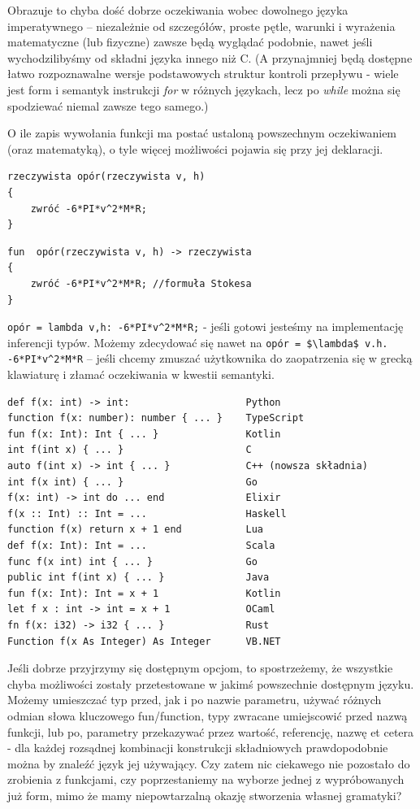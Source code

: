 Obrazuje to chyba dość dobrze oczekiwania wobec dowolnego języka imperatywnego – niezależnie od szczegółów, proste pętle, warunki i wyrażenia matematyczne (lub fizyczne) zawsze będą wyglądać podobnie, nawet jeśli wychodzilibyśmy od składni języka innego niż C. (A przynajmniej będą dostępne łatwo rozpoznawalne wersje podstawowych struktur kontroli przepływu - wiele jest form i semantyk instrukcji \textit{for} w różnych językach, lecz po \textit{while} można się spodziewać niemal zawsze tego samego.)

O ile zapis wywołania funkcji ma postać ustaloną powszechnym oczekiwaniem (oraz matematyką), o tyle więcej możliwości pojawia się przy jej deklaracji.
\begin{lstlisting}
rzeczywista opór(rzeczywista v, h)
{
	zwróć -6*PI*v^2*M*R;
}
\end{lstlisting}

\begin{lstlisting}
fun  opór(rzeczywista v, h) -> rzeczywista
{
	zwróć -6*PI*v^2*M*R; //formuła Stokesa
}
\end{lstlisting}
\lstinline[columns=fixed]{opór = lambda v,h: -6*PI*v^2*M*R;} - jeśli gotowi jesteśmy na implementację inferencji typów.
Możemy zdecydować się nawet na \lstinline[columns=fixed, mathescape]{opór = $\lambda$ v.h. -6*PI*v^2*M*R} – jeśli chcemy zmuszać użytkownika do zaopatrzenia się w grecką klawiaturę i złamać oczekiwania w kwestii semantyki.

\lstset{
    escapechar=@
    breaklines=true
}
\begin{lstlisting}
def f(x: int) -> int:               	 Python
function f(x: number): number { ... }    TypeScript
fun f(x: Int): Int { ... }          	 Kotlin
int f(int x) { ... }                	 C
auto f(int x) -> int { ... }        	 C++ (nowsza składnia)
int f(x int) { ... }                	 Go
f(x: int) -> int do ... end         	 Elixir
f(x :: Int) :: Int = ...            	 Haskell
function f(x) return x + 1 end      	 Lua
def f(x: Int): Int = ...            	 Scala
func f(x int) int { ... }           	 Go
public int f(int x) { ... }         	 Java
fun f(x: Int): Int = x + 1          	 Kotlin
let f x : int -> int = x + 1        	 OCaml
fn f(x: i32) -> i32 { ... }         	 Rust
Function f(x As Integer) As Integer 	 VB.NET
\end{lstlisting}
\lstset{
    escapechar=|,
    breaklines=true
}
Jeśli dobrze przyjrzymy się dostępnym opcjom, to spostrzeżemy, że wszystkie chyba możliwości zostały przetestowane w jakimś powszechnie dostępnym języku. Możemy umieszczać typ przed, jak i po nazwie parametru, używać różnych odmian słowa kluczowego fun/function, typy zwracane umiejscowić przed nazwą funkcji, lub po, parametry przekazywać przez wartość, referencję, nazwę et cetera - dla każdej rozsądnej kombinacji konstrukcji składniowych prawdopodobnie można by znaleźć język jej używający.
Czy zatem nic ciekawego nie pozostało do zrobienia z funkcjami, czy poprzestaniemy na wyborze jednej z wypróbowanych już form, mimo że mamy niepowtarzalną okazję stworzenia własnej gramatyki? %

